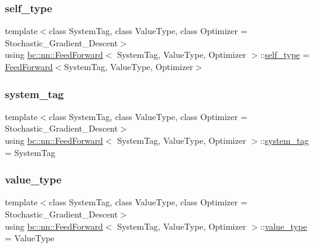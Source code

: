 \subsubsection{\texorpdfstring{self\+\_\+type}{self\_type}}
{\footnotesize\ttfamily template$<$class System\+Tag, class Value\+Type, class Optimizer = Stochastic\+\_\+\+Gradient\+\_\+\+Descent$>$ \\
using \hyperlink{structbc_1_1nn_1_1FeedForward}{bc\+::nn\+::\+Feed\+Forward}$<$ System\+Tag, Value\+Type, Optimizer $>$\+::\hyperlink{structbc_1_1nn_1_1FeedForward_aed5e64ba066faee4ed589d71a5d8dd56}{self\+\_\+type} =  \hyperlink{structbc_1_1nn_1_1FeedForward}{Feed\+Forward}$<$System\+Tag, Value\+Type, Optimizer$>$}

\mbox{\label{structbc_1_1nn_1_1FeedForward_ab1ef75eb0a5da610e739f11a29a2cc37}} 
\subsubsection{\texorpdfstring{system\+\_\+tag}{system\_tag}}
{\footnotesize\ttfamily template$<$class System\+Tag, class Value\+Type, class Optimizer = Stochastic\+\_\+\+Gradient\+\_\+\+Descent$>$ \\
using \hyperlink{structbc_1_1nn_1_1FeedForward}{bc\+::nn\+::\+Feed\+Forward}$<$ System\+Tag, Value\+Type, Optimizer $>$\+::\hyperlink{structbc_1_1nn_1_1FeedForward_ab1ef75eb0a5da610e739f11a29a2cc37}{system\+\_\+tag} =  System\+Tag}

\mbox{\label{structbc_1_1nn_1_1FeedForward_ac5c2aca3fbe5dc0274874f302ad027fd}} 
\subsubsection{\texorpdfstring{value\+\_\+type}{value\_type}}
{\footnotesize\ttfamily template$<$class System\+Tag, class Value\+Type, class Optimizer = Stochastic\+\_\+\+Gradient\+\_\+\+Descent$>$ \\
using \hyperlink{structbc_1_1nn_1_1FeedForward}{bc\+::nn\+::\+Feed\+Forward}$<$ System\+Tag, Value\+Type, Optimizer $>$\+::\hyperlink{structbc_1_1nn_1_1FeedForward_ac5c2aca3fbe5dc0274874f302ad027fd}{value\+\_\+type} =  Value\+Type}



